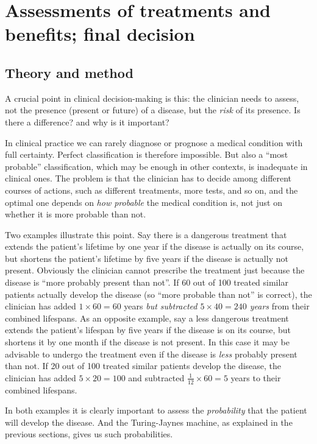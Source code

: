 \documentclass[utf8]{FrontiersinHarvard} %
\renewcommand*{\|}[1][]{\nonscript\:#1\vert\nonscript\:\mathopen{}}
\newcommand*{\tjm}{Turing-Jaynes machine}
\begin{document}
\section{Assessments of treatments and benefits; final decision}
\label{sec:utilities_step}

\subsection{Theory and method}
\label{sec:expected_utility_theory}


A crucial point in clinical decision-making is this: the clinician needs to assess, not the presence (present or future) of a disease, but the \emph{risk} of its presence. Is there a difference? and why is it important?

In clinical practice we can rarely diagnose or prognose a medical condition with full certainty. Perfect classification is therefore impossible. But also a \enquote{most probable} classification, which may be enough in other contexts, is inadequate in clinical ones. The problem is that the clinician has to decide among different courses of actions, such as different treatments, more tests, and so on, and the optimal one depends on \emph{how probable} the medical condition is, not just on whether it is more probable than not.

Two examples illustrate this point. Say there is a dangerous treatment that extends the patient's lifetime by one year if the disease is actually on its course, but shortens the patient's lifetime by five years if the disease is actually not present. Obviously the clinician cannot prescribe the treatment just because the disease is \enquote{more probably present than not}. If 60 out of 100 treated similar patients actually develop the disease (so \enquote{more probable than not} is correct), the clinician has added $1 \times 60 = 60$ years \emph{but subtracted $\mathit{5 \times 40 = 240}$ years} from their combined lifespans. As an opposite example, say a less dangerous treatment extends the patient's lifespan by five years if the disease is on its course, but shortens it by one month if the disease is not present. In this case it may be advisable to undergo the treatment even if the disease is \emph{less} probably present than not. If 20 out of 100 treated similar patients develop the disease, the clinician has added $5 \times 20=100$ and subtracted $\tfrac{1}{12} \times 60=5$ years to their combined lifespans.

In both examples it is clearly important to assess the \emph{probability} that the patient will develop the disease. And the \tjm, as explained in the previous sections, gives us such probabilities.
\end{document}
